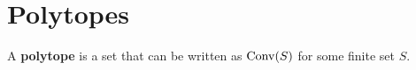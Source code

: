 \section{Polytopes}



\begin{definition}[Polytope]
    \label{polytope}
  
    A {\bf polytope} is a set that can be written as $\operatorname{Conv}(S)$ for some finite set $S$.
  \end{definition}